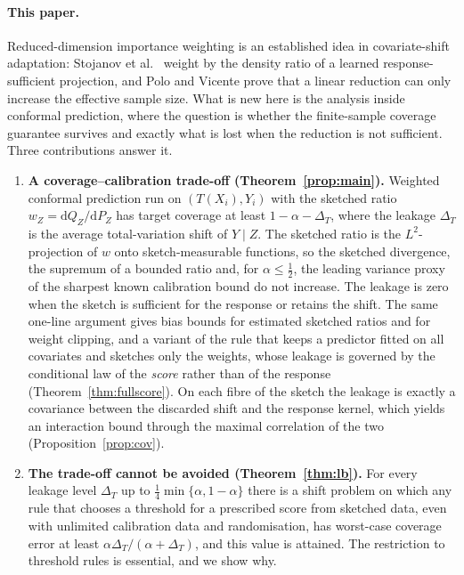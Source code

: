 \documentclass[11pt,a4paper]{article}
\theoremstyle{plain}
\theoremstyle{definition}
\theoremstyle{remark}
\begin{document}
\paragraph{This paper.}
Reduced-dimension importance weighting is an established idea in covariate-shift adaptation: Stojanov et al.\ \cite{stojanov2019} weight by the density ratio of a learned response-sufficient projection, and Polo and Vicente \cite{polo2022} prove that a linear reduction can only increase the effective sample size. What is new here is the analysis inside conformal prediction, where the question is whether the finite-sample coverage guarantee survives and exactly what is lost when the reduction is not sufficient. Three contributions answer it.
\begin{enumerate}[leftmargin=1.8em,itemsep=2pt]
\item \textbf{A coverage--calibration trade-off (Theorem~\ref{prop:main}).} Weighted conformal prediction run on $(T(X_i),Y_i)$ with the sketched ratio $w_Z=\mathrm dQ_Z/\mathrm dP_Z$ has target coverage at least $1-\alpha-\Delta_T$, where the leakage $\Delta_T$ is the average total-variation shift of $Y\mid Z$. The sketched ratio is the $L^2$-projection of $w$ onto sketch-measurable functions, so the sketched divergence, the supremum of a bounded ratio and, for $\alpha\le\tfrac12$, the leading variance proxy of the sharpest known calibration bound do not increase. The leakage is zero when the sketch is sufficient for the response or retains the shift. The same one-line argument gives bias bounds for estimated sketched ratios and for weight clipping, and a variant of the rule that keeps a predictor fitted on all covariates and sketches only the weights, whose leakage is governed by the conditional law of the \emph{score} rather than of the response (Theorem~\ref{thm:fullscore}). On each fibre of the sketch the leakage is exactly a covariance between the discarded shift and the response kernel, which yields an interaction bound through the maximal correlation of the two (Proposition~\ref{prop:cov}).
\item \textbf{The trade-off cannot be avoided (Theorem~\ref{thm:lb}).} For every leakage level $\Delta_T$ up to $\tfrac14\min\{\alpha,1-\alpha\}$ there is a shift problem on which any rule that chooses a threshold for a prescribed score from sketched data, even with unlimited calibration data and randomisation, has worst-case coverage error at least $\alpha\Delta_T/(\alpha+\Delta_T)$, and this value is attained. The restriction to threshold rules is essential, and we show why.

\end{enumerate}
\end{document}
